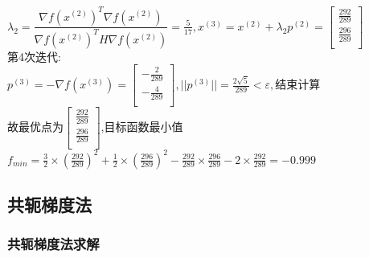 \begin{solution}
    $\lambda_2=\dfrac{\nabla f(x^{(2)})^T\nabla f(x^{(2)})}{\nabla f(x^{(2)})^TH\nabla f(x^{(2)})}=\frac{5}{17},x^{(3)}=x^{(2)}+\lambda_2p^{(2)}=\begin{bmatrix} \frac{292}{289}\\\frac{296}{289}\\\end{bmatrix}$\\
    第4次迭代:\\
    $p^{(3)}=-\nabla f(x^{(3)})=\begin{bmatrix} -\frac{2}{289}\\-\frac{4}{289}\\\end{bmatrix},||p^{(3)}||=\frac{2\sqrt{5}}{289}<\varepsilon,\text{结束计算}$\\
    故最优点为$\begin{bmatrix} \frac{292}{289}\\\frac{296}{289}\\\end{bmatrix}$,目标函数最小值$f_{min}=\frac{3}{2}\times(\frac{292}{289})^2+\frac{1}{2}\times(\frac{296}{289})^2-\frac{292}{289}\times\frac{296}{289}-2\times\frac{292}{289}=-0.999$
\end{solution}

\subsection{共轭梯度法}

\subsubsection{共轭梯度法求解}

